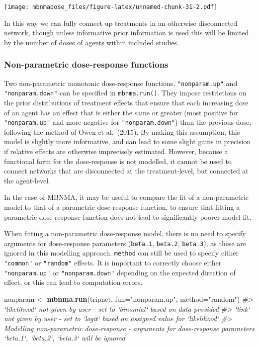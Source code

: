 \documentclass[]{article}
\newenvironment{Shaded}{\begin{snugshade}}{\end{snugshade}}
\newcommand{\CommentTok}[1]{\textcolor[rgb]{0.56,0.35,0.01}{\textit{#1}}}
\newcommand{\DataTypeTok}[1]{\textcolor[rgb]{0.13,0.29,0.53}{#1}}
\newcommand{\KeywordTok}[1]{\textcolor[rgb]{0.13,0.29,0.53}{\textbf{#1}}}
\newcommand{\NormalTok}[1]{#1}
\newcommand{\StringTok}[1]{\textcolor[rgb]{0.31,0.60,0.02}{#1}}
\begin{document}
\texttt{[image: mbnmadose\_files/figure-latex/unnamed-chunk-31-2.pdf]}

In this way we can fully connect up treatments in an otherwise
disconnected network, though unless informative prior information is
used this will be limited by the number of doses of agents within
included studies.

\hypertarget{non-parametric-dose-response-functions}{%
\subsubsection{Non-parametric dose-response
functions}\label{non-parametric-dose-response-functions}}

Two non-parametric monotonic dose-response functions,
\texttt{"nonparam.up"} and \texttt{"nonparam.down"} can be specified in
\texttt{mbnma.run()}. They impose restrictions on the prior
distributions of treatment effects that ensure that each increasing dose
of an agent has an effect that is either the same or greater (most
positive for \texttt{"nonparam.up"} and more negative for
\texttt{"nonparam.down"}) than the previous dose, following the method
of Owen et al.~(2015). By making this assumption, this model is slightly
more informative, and can lead to some slight gains in precision if
relative effects are otherwise imprecisely estimated. However, because a
functional form for the dose-response is not modelled, it cannot be used
to connect networks that are disconnected at the treatment-level, but
connected at the agent-level.

In the case of MBNMA, it may be useful to compare the fit of a
non-parametric model to that of a parametric dose-response function, to
ensure that fitting a parametric dose-response function does not lead to
significantly poorer model fit.

When fitting a non-parametric dose-response model, there is no need to
specify arguments for dose-response parameters (\texttt{beta.1},
\texttt{beta.2}, \texttt{beta.3}), as these are ignored in this
modelling approach. \texttt{method} can still be used to specify either
\texttt{"common"} or \texttt{"random"} effects. It is important to
correctly choose either \texttt{"nonparam.up"} or
\texttt{"nonparam.down"} depending on the expected direction of effect,
or this can lead to computation errors.

\begin{Shaded}
\begin{Highlighting}[]
\NormalTok{nonparam <-}\StringTok{ }\KeywordTok{mbnma.run}\NormalTok{(tripnet, }\DataTypeTok{fun=}\StringTok{"nonparam.up"}\NormalTok{, }\DataTypeTok{method=}\StringTok{"random"}\NormalTok{)}
\CommentTok{#> `likelihood` not given by user - set to `binomial` based on data provided}
\CommentTok{#> `link` not given by user - set to `logit` based on assigned value for `likelihood`}
\CommentTok{#> Modelling non-parametric dose-response - arguments for dose-response parameters `beta.1`, `beta.2`, `beta.3` will be ignored}
\end{Highlighting}
\end{Shaded}
\end{document}
